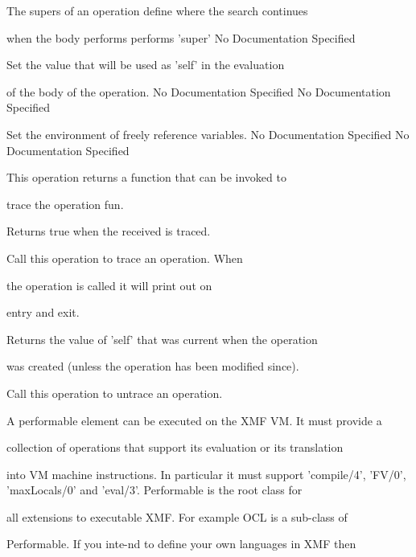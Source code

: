       The supers of an operation define where the search continues

      when the body performs performs 'super'
No Documentation Specified

      Set the value that will be used as 'self' in the evaluation

      of the body of the operation.
No Documentation Specified
No Documentation Specified

      Set the environment of freely reference variables.
No Documentation Specified
No Documentation Specified

      This operation returns a function that can be invoked to

      trace the operation fun.

      Returns true when the received is traced.

      Call this operation to trace an operation. When

      the operation is called it will print out on

      entry and exit.

      Returns the value of 'self' that was current when the operation

      was created (unless the operation has been modified since).

      Call this operation to untrace an operation.

     A performable element can be executed on the XMF VM. It must provide a

     collection of operations that support its evaluation or its translation

     into VM machine instructions. In particular it must support 'compile/4',
     'FV/0', 'maxLocals/0' and 'eval/3'. Performable is the root class for

     all extensions to executable XMF. For example OCL is a sub-class of

     Performable. If you inte-nd to define your own languages in XMF then

